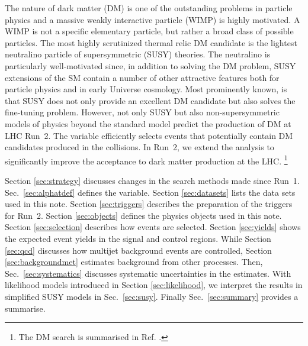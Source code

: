 The nature of dark matter (DM) is one of the outstanding problems in
particle physics and a massive weakly interactive particle (WIMP) is
highly motivated. A WIMP is not a specific elementary particle, but
rather a broad class of possible particles. The most highly
scrutinized thermal relic DM candidate is the lightest neutralino
particle of supersymmetric (SUSY) theories. The neutralino is
particularly well-motivated since, in addition to solving the DM
problem, SUSY extensions of the SM contain a number of other
attractive features both for particle physics and in early Universe
cosmology. Most prominently known, is that SUSY does not only provide
an excellent DM candidate but also solves the fine-tuning problem.
However, not only SUSY but also non-supersymmetric models of physics
beyond the standard model predict the production of DM at LHC Run~2.
The \alphat variable efficiently selects events that potentially
contain DM candidates produced in the collisions. In Run~2, we extend
the \alphat analysis to significantly improve the acceptance to dark
matter production at the LHC. \footnote{The DM search is summarised in
Ref. \cite{CMS_AN_2015-279}.}

Section \ref{sec:strategy} discusses changes in the search methods
made since Run~1. Sec.~\ref{sec:alphatdef} defines the \alphat
variable. Section \ref{sec:datasets} lists the data sets used in this
note. Section \ref{sec:triggers} describes the preparation of the
triggers for Run~2. Section \ref{sec:objects} defines the physics
objects used in this note. Section \ref{sec:selection} describes how
events are selected. Section \ref{sec:yields} shows the expected event
yields in the signal and control regions. While Section \ref{sec:qcd}
discusses how multijet background events are controlled, Section
\ref{sec:backgroundmet} estimates background from other processes.
Then, Sec.~\ref{sec:systematics} discusses systematic uncertainties in
the estimates. With likelihood models introduced in Section
\ref{sec:likelihood}, we interpret the results in simplified SUSY
models in Sec.~\ref{sec:susy}. Finally Sec.~\ref{sec:summary} provides
a summarise.

